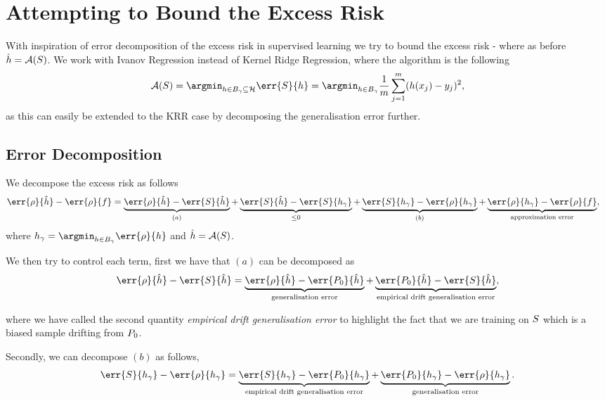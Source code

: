 \section{Attempting to Bound the Excess Risk}
With inspiration of error decomposition of the excess risk in
supervised learning we try to bound the excess risk
 - 
where as before \(\hat{h} = \mathcal{A}(S)\). We work with
Ivanov Regression instead of Kernel Ridge Regression, where the algorithm is
the following
\begin{equation*}
  \label{eq:eq:ivanov-kr}
  \algo(\trainset) = \argmin_{h \in B_{\gamma} \subseteq \rkhs{H}} \err{S}{h} = \argmin_{h \in B_{\gamma}} \frac{1}{m}  \sum_{j=1}^{m}(h(x_{j}) - y_{j})^{2},
\end{equation*}
as this can easily be extended to the KRR case by decomposing the generalisation
error further.

\subsection{Error Decomposition}
\label{sec:error-decomposition}
We decompose the excess risk as follows
\begin{align*}
  \err{\rho}{\hat{h}} - \err{\rho}{f} & = \underbrace{\err{\rho}{\hat{h}} - \err{\trainset}{\hat{h}}}_{(a)} + \underbrace{\err{\trainset}{\hat{h}} - \err{\trainset}{h_{\gamma}}}_{\leq 0} + \underbrace{\err{\trainset}{h_{\gamma}} - \err{\rho}{h_{\gamma}}}_{(b)} + \underbrace{\err{\rho}{h_{\gamma}} - \err{\rho}{f}}_{\text{approximation error}},
\end{align*}
where \(h_{\gamma} = \argmin_{h \in B_{\gamma}} \err{\rho}{h}\) and
\(\hat{h} = \mathcal{A}(S)\).

We then try to control each term, first we have that \((a)\) can be decomposed
as 
\begin{equation*}
  \err{\rho}{\hat{h}} - \err{\trainset}{\hat{h}} = \underbrace{\err{\rho}{\hat{h}} - \err{\poolset_0}{\hat{h}}}_{\text{generalisation error}} + \underbrace{\err{\poolset_0}{\hat{h}} - \err{\trainset}{\hat{h}}}_{\text{empirical drift generalisation error}},
\end{equation*}

where we have called the second quantity \emph{empirical drift generalisation error} to highlight the fact that we are training on \(S\) which is a
biased sample drifting from \(P_0\).

Secondly, we can decompose \((b)\) as follows,
\begin{equation*}
  \err{\trainset}{h_{\gamma}} - \err{\rho}{h_{\gamma}} = \underbrace{\err{\trainset}{h_{\gamma}} - \err{\poolset_0}{h_{\gamma}}}_{\text{empirical drift generalisation error}} +\underbrace{\err{\poolset_0}{h_{\gamma}} - \err{\rho}{h_{\gamma}}}_{\text{generalisation error}}.
\end{equation*}

